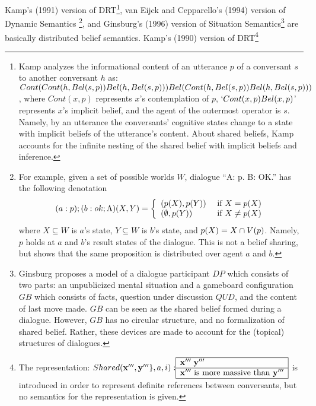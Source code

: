 Kamp's (1991) version of DRT\<\footnote{
Kamp analyzes the informational content of an utterance $p$ of a conversant $s$ to another conversant $h$ as:
$Cont(Cont(h,Bel(s,p)) Bel(h,Bel(s,p))) Bel(Cont(h,Bel(s,p)) Bel(h,Bel(s,p)))$, where $Cont(x,p)$ represents $x$'s contemplation of $p$, `$Cont(x,p) Bel(x,p)$' represents $x$'s implicit belief, and the agent of the outermost operator is $s$.
Namely, by an utterance the conversants' cognitive states change to a state with implicit beliefs of the utterance's content.
About shared beliefs, Kamp accounts for the infinite nesting of the shared belief with implicit beliefs and inference.
}, van Eijck and Cepparello's (1994) version of Dynamic Semantics\< \footnote{
For example, given a set of possible worlds $W$, dialogue ``A: p. B: OK.'' has the following denotation
$$
 (a:p);(b:ok;\Lambda)(X,Y)=
\left\{
\begin{array}{ll}
( p(X), p(Y)) & \mbox{ if }X= p(X)\\
(\emptyset, p(Y)) & \mbox{ if }X\neq p(X)\\
\end{array}
\right.
$$
where $X\subseteq W$ is $a$'s state, $Y\subseteq W$ is $b$'s state,
and $ p(X)=X\cap V(p)$.
Namely, $p$ holds at $a$ and $b$'s result states of the dialogue.
This is not a belief sharing, but shows that the same proposition is distributed over agent $a$ and $b$.
}, and Ginsburg's (1996) version of Situation Semantics\<\footnote{
Ginsburg proposes a model of a dialogue participant $DP$ which consists of two parts: an unpublicized mental situation and a gameboard configuration $GB$ which consists of facts, question under discussion $QUD$, and the content of last move made.
$GB$ can be seen as the shared belief formed during a dialogue.
However, $GB$ has no circular structure, and no formalization of shared belief.
Rather, these devices are made to account for the (topical) structures of dialogues.
}
 are basically distributed belief semantics.
Kamp's (1990) version of DRT\<\footnote{The representation:
$
Shared({\bf x}''',{\bf y}'''\},a,i):\vline\hspace{-1mm}
\begin{array}[c]{l} \hline 
{\bf x}'''\; {\bf y}'''\\
\hline
{\bf x}'''\mbox{ is more massive than }{\bf y}'''\\
\hline
\end{array} \vline 
$
 is introduced in order to represent definite references between conversants, but no semantics for the representation is given.
}

